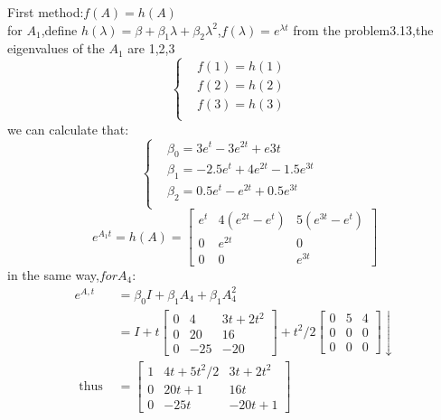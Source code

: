 \documentclass{article}
\begin{document}
First method:$f(A)=h(A)$\\
for $A_1$,define $h(\lambda)=\beta+\beta_1\lambda+\beta_2\lambda^2$,$f(\lambda)=e^{\lambda t}$
from the problem3.13,the eigenvalues of the $A_1$ are 1,2,3\\
\[
\left\{
\begin{aligned}
&f(1)=h(1)&\\
&f(2)=h(2)&\\
&f(3)=h(3)&\\
\end{aligned}
\right.
\]
we can calculate that:
\[
\left\{
\begin{aligned}
&\beta_0=3e^t-3e^{2t}+e{3t}&\\
&\beta_1=-2.5e^t+4e^{2t}-1.5e^{3t}&\\
&\beta_2=0.5e^t-e^{2t}+0.5e^{3t}&\\
\end{aligned}
\right.
\]
\[
e^{A_1t}=h(A)    
=\left[
\begin{array}{ccc}
e^{t} & 4\left(e^{2 t}-e^{t}\right) & 5\left(e^{3 t}-e^{t}\right) \\
0 & e^{2 t} & 0 \\
0 & 0 & e^{3t}
\end{array}
\right]
\]
in the same way,$for A_4$:\\
\[
\begin{aligned}
e^{A, t} &=\beta_{0} I+\beta_{1} A_{4}+\beta_{1} A_{4}^{2} \\
&=I+t\left[\begin{array}{ccc}
0 & 4 & 3 t+2 t^{2} \\
0 & 20 & 16 \\
0 & -25 & -20
\end{array}\right]+t^{2} / 2\left[\begin{array}{ccc}
0 & 5 & 4 \\
0 & 0 & 0 \\
0 & 0 & 0
\end{array}\right] \downarrow \\
\text { thus } &=\left[\begin{array}{ccc}
1 & 4 t+5 t^{2} / 2 & 3 t+2 t^{2} \\
0 & 20 t+1 & 16 t \\
0 & -25 t & -20 t+1
\end{array}\right]
\end{aligned}
\]
\end{document}
